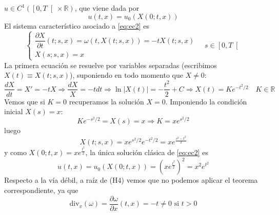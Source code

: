 \documentclass[12pt]{article}
\newcommand{\R}{\mathbb{R}}
\newcommand{\di}{\text{div}}
\begin{document}
\begin{ejercicio}
        $u \in C^1(\left[0, T \right[ \times \R)$, que viene dada por 
        $$u(t,x) = u_0(X(0;t,x))$$ 
        El sistema característico asociado a \eqref{eq:ec2} es 
        \begin{equation*}
            \begin{cases}
                \dfrac{\partial X}{\partial t}(t;s,x)
                =\omega(t,X(t;s,x)) = -tX(t;s,x)\\[6pt]
                X(s;s,x)=x
            \end{cases}\quad s \in \left[0, T \right[
        \end{equation*}
        La primera ecuación se resuelve por variables separadas (escribimos $X(t) \equiv X(t;s,x)$), suponiendo en todo momento que $X \neq 0$:
        $$\dfrac{dX}{dt} = X' = -tX \Longrightarrow \dfrac{dX}{X} = -t dt \Longrightarrow \ln|X(t)| = - \dfrac{t^2}{2} + C \Longrightarrow X(t) = Ke^{-t^2/2} \quad K \in \R$$
        Vemos que si $K = 0$ recuperamos la solución $X = 0$. Imponiendo la condición inicial $X(s) = x$:
        $$Ke^{-s^2/2} = X(s) = x \Longrightarrow K = xe^{s^2/2}$$
        luego
        $$X(t;s,x) = xe^{s^2/2}e^{-t^2/2} = xe^{\frac{s^2 - t^2}{2}}$$
        y como $X(0;t,x) = xe^{\frac{t^2}{2}}$, la única solución clásica de \eqref{eq:ec2} es
        $$\boxed{u(t,x) = u_0(X(0;t,x)) = \left( xe^{\frac{t^2}{2}} \right)^2 = x^2 e^{t^2}}$$
        Respecto a la vía débil, a raíz de (H4) vemos que no podemos aplicar el teorema correspondiente, ya que 
        $$\di_x(\omega) = \dfrac{\partial \omega}{\partial x}(t,x) = -t \neq 0 \text{ si } t > 0$$
    \end{ejercicio}
\end{document}
